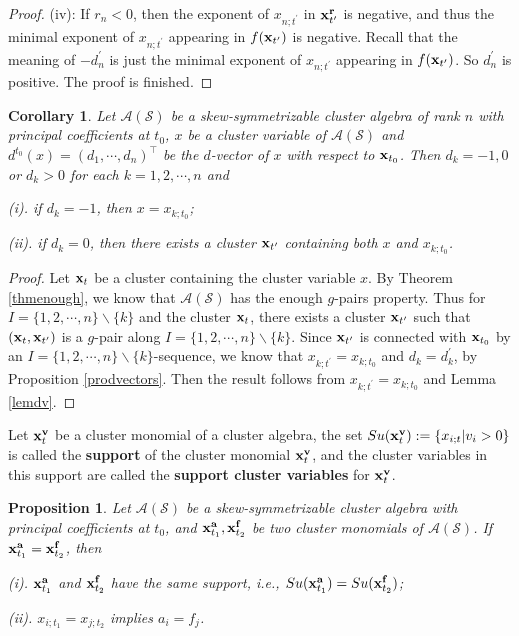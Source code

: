 \documentclass[14pt]{amsart}
\newtheorem{Corollary}[Theorem]{Corollary}
\newtheorem{Proposition}[Theorem]{Proposition}
\begin{document}
\begin{proof}
(iv): If $r_{n}<0$, then the exponent of $x_{n;t^\prime}$ in  ${\bf x}_{t^\prime}^{{\bf r}}$ is negative, and thus the minimal exponent of $x_{n;t^\prime}$ appearing in $f({\bf x}_{t^\prime})$ is negative. Recall that the meaning of $-d_{n}^\prime$ is just the minimal exponent of $x_{n;t^\prime}$ appearing in $f({\bf x}_{t^\prime})$. So $d_{n}^\prime$ is positive. The proof is finished.
\end{proof}




\begin{Corollary}\label{thmdvectors}
Let $\mathcal A(\mathcal S)$ be a skew-symmetrizable cluster algebra of rank $n$ with principal coefficients at $t_0$, $x$ be a cluster variable of $\mathcal A(\mathcal S)$ and $d^{t_0}(x)=(d_1,\cdots,d_n)^{\top}$ be the $d$-vector of $x$ with respect to ${\bf x}_{t_0}$. Then $d_k=-1,0$ or $d_k>0$ for each $k=1,2,\cdots,n$ and

(i). if $d_k=-1$, then $x=x_{k;t_0}$;


(ii). if $d_k=0$, then there exists a cluster ${\bf x}_{t^{\prime}}$ containing both $x$ and $x_{k;t_0}$.
\end{Corollary}
\begin{proof}
 Let ${\bf x}_t$ be a cluster containing the cluster variable $x$. By Theorem \ref{thmenough}, we know that $\mathcal A(\mathcal S)$ has  the enough $g$-pairs property. Thus for $I=\{1,2,\cdots,n\}\backslash\{k\}$ and the cluster ${\bf x}_t$, there exists a cluster ${\bf x}_{t^\prime}$ such that $({\bf x}_t,{\bf x}_{t^\prime})$ is a $g$-pair along $I=\{1,2,\cdots,n\}\backslash\{k\}$. Since ${\bf x}_{t^\prime}$  is connected with ${\bf x}_{t_0}$ by an $I=\{1,2,\cdots,n\}\backslash\{k\}$-sequence, we know that $x_{k;t^\prime}=x_{k;t_0}$ and  $d_k=d_k^\prime$, by Proposition \ref{prodvectors}.
 Then the result follows  from $x_{k;t^\prime}=x_{k;t_0}$ and Lemma \ref{lemdv}.
\end{proof}






Let ${\bf x}_t^{\bf v}$ be a cluster monomial of a cluster algebra,  the set $Su({\bf x}_t^{\bf v}):=\{x_{i;t}| v_i>0\}$ is called the {\bf support} of the cluster monomial ${\bf x}_t^{\bf v}$, and the cluster variables in this support are called the {\bf support cluster variables} for ${\bf x}_t^{\bf v}$.
\begin{Proposition}\label{prosupport}
Let  $\mathcal A(\mathcal S)$ be a skew-symmetrizable cluster algebra  with principal coefficients at $t_0$, and ${\bf x}_{t_1}^{\bf a},{\bf x}_{t_2}^{\bf f}$ be two cluster monomials of $\mathcal A(\mathcal S)$. If  ${\bf x}_{t_1}^{\bf a}={\bf x}_{t_2}^{\bf f}$, then

(i). ${\bf x}_{t_1}^{\bf a}$ and ${\bf x}_{t_2}^{\bf f}$ have the same support, i.e., $Su({\bf x}_{t_1}^{\bf a})=Su({\bf x}_{t_2}^{\bf f})$;

(ii). $x_{i;t_1}=x_{j;t_2}$ implies $a_i=f_j$.
\end{Proposition}
\end{document}
